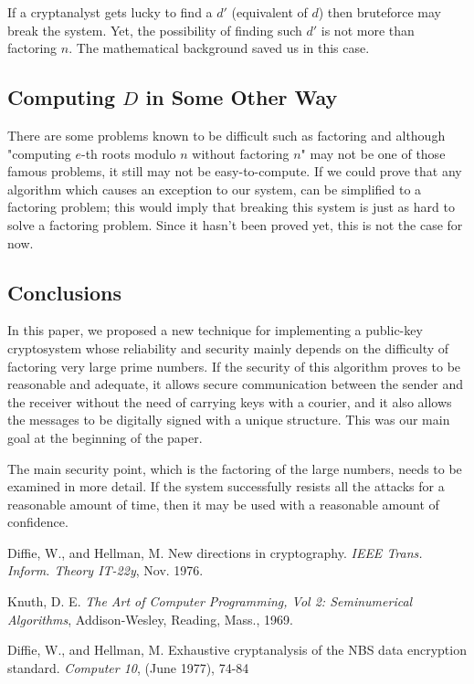 \documentclass[12pt, letterpaper]{article}
\begin{document}
If a cryptanalyst gets lucky to find a $d'$ (equivalent of $d$) then bruteforce may break the system. Yet, the possibility of finding such $d'$ is not more than factoring $n$. The mathematical background saved us in this case.

\subsection{Computing $D$ in Some Other Way}

There are some problems known to be difficult such as factoring and although "computing $e$-th roots modulo $n$ without factoring $n$" may not be one of those famous problems, it still may not be easy-to-compute. If we could prove that any algorithm which causes an exception to our system, can be simplified to a factoring problem; this would imply that breaking this system is just as hard to solve a factoring problem. Since it hasn’t been proved yet, this is not the case for now.

\subsection{Conclusions}

In this paper, we proposed a new technique for implementing a public-key cryptosystem whose reliability and security mainly depends on the difficulty of factoring very large prime numbers. If the security of this algorithm proves to be reasonable and adequate, it allows secure communication between the sender and the receiver without the need of carrying keys with a courier, and it also allows the messages to be digitally signed with a unique structure. This was our main goal at the beginning of the paper.

The main security point, which is the factoring of the large numbers, needs to be examined in more detail. If the system successfully resists all the attacks for a reasonable amount of time, then it may be used with a reasonable amount of confidence.

\begin{thebibliography}{9}
Diffie, W., and Hellman, M.
New directions in cryptography. 
\textit{IEEE Trans. Inform. Theory IT-22y}, 
Nov. 1976.

Knuth, D. E.
\textit{The Art of Computer Programming, Vol 2: Seminumerical Algorithms}, 
Addison-Wesley, Reading, Mass., 1969.

Diffie, W., and Hellman, M.
Exhaustive cryptanalysis of the NBS data encryption
standard. 
\textit{Computer 10}, 
(June 1977), 74-84
\end{thebibliography}
\end{document}
